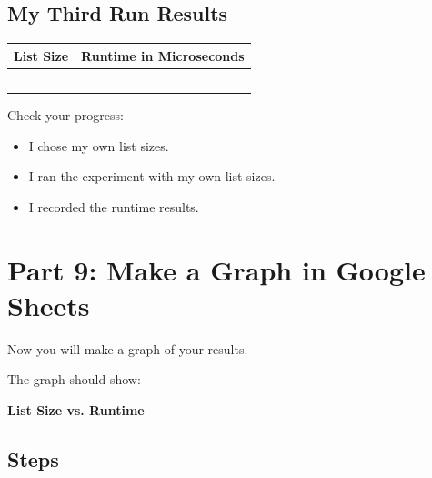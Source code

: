 \documentclass[11pt]{article}
\newcommand{\checkbox}{$\square$}
\begin{document}
\vspace{0.3in}

\noindent
\underline{\hspace{6.2in}}

\vspace{0.2in}

\subsection*{My Third Run Results}

\begin{center}
\begin{tabular}{|c|c|}
\hline
\textbf{List Size} & \textbf{Runtime in Microseconds} \\
\hline
 & \\
\hline
 & \\
\hline
 & \\
\hline
 & \\
\hline
 & \\
\hline
\end{tabular}
\end{center}

\noindent Check your progress:

\begin{itemize}
    \item[\checkbox] I chose my own list sizes.
    \item[\checkbox] I ran the experiment with my own list sizes.
    \item[\checkbox] I recorded the runtime results.
\end{itemize}

\section*{Part 9: Make a Graph in Google Sheets}

Now you will make a graph of your results.

The graph should show:

\begin{center}
\textbf{List Size vs. Runtime}
\end{center}

\subsection*{Steps}
\end{document}
